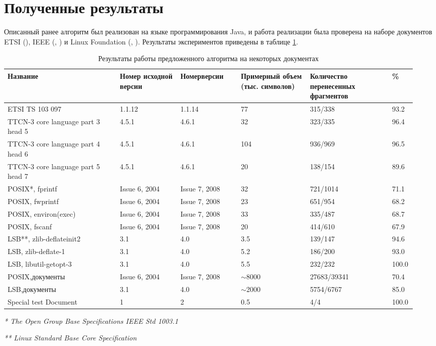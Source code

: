 \section{Полученные результаты}
\label{sec:Chapter5} 

Описанный ранее алгоритм был реализован на языке программирования Java, и работа реализации была проверена на наборе документов ETSI (\cite{web:etsi461}), IEEE (\cite{web:POSIX2004}, \cite{web:POSIX2008}) и Linux Foundation (\cite{web:LSB3}, \cite{web:LSB4}). Результаты экспериментов приведены в таблице \ref{tabular:results}.

\begin{table}[H]
\caption{Результаты работы предложенного алгоритма на некоторых документах}
\label{tabular:results}
\begin{center}
\begin{tabular}{|p{0.26\linewidth}|p{0.14\linewidth}|p{0.14\linewidth}|p{0.16\linewidth}|p{0.19\linewidth}|p{0.05\linewidth}|}
\hline
\textbf{Название} & \textbf{Номер исходной версии} & \textbf{Номер\newline версии} & \textbf{Примерный объем (тыс. символов)} & \textbf{Количество перенесенных фрагментов} & \textbf{\%} \\
\hline
ETSI TS 103 097 & 1.1.12 & 1.1.14 & 77 & 315/338 &  93.2\\
\hline
TTCN-3 core language part 3 head 5 & 4.5.1 & 4.6.1 & 32 & 323/335 & 96.4\\
\hline
TTCN-3 core language part 4 head 6 & 4.5.1 & 4.6.1 & 104 & 936/969 & 96.5\\
\hline
TTCN-3 core language part 5 head 7 & 4.5.1 & 4.6.1 & 20 & 138/154 & 89.6\\
\hline
POSIX*, fprintf & Issue 6, 2004 & Issue 7, 2008 & 32 & 721/1014 & 71.1\\
\hline
POSIX, fwprintf & Issue 6, 2004 & Issue 7, 2008 & 23 & 651/954 & 68.2\\
\hline
POSIX, environ(exec) & Issue 6, 2004 & Issue 7, 2008 & 33 & 335/487 & 68.7\\
\hline
POSIX, fscanf & Issue 6, 2004 & Issue 7, 2008 & 20 & 414/610 & 67.9\\
\hline
LSB**, zlib-deflateinit2 & 3.1 & 4.0 & 3.5 & 139/147 & 94.6\\
\hline
LSB, zlib-deflate-1 & 3.1 & 4.0 & 5.2 & 186/200 & 93.0\\
\hline
LSB, libutil-getopt-3 & 3.1 & 4.0 & 5.5 & 232/232 & 100.0\\
\hline
POSIX, документы & Issue 6, 2004 & Issue 7, 2008 & $\sim$8000 & 27683/39341 & 70.4\\
\hline
LSB, документы & 3.1 & 4.0 & $\sim$2000 & 5754/6767 & 85.0\\
\hline
Special test Document & 1 & 2 & 0.5 & 4/4 & 100.0 \\
\hline
\end{tabular}
\end{center}
\emph{* The Open Group Base Specifications IEEE Std 1003.1}

\emph{** Linux Standard Base Core Specification}
\end{table}

